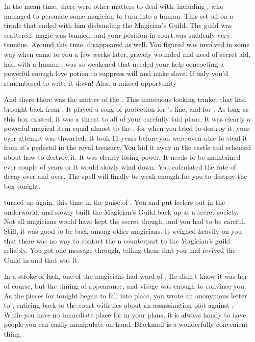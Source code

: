\documentclass[char]{NeptuneBall}
\begin{document}
In the mean time, there were other matters to deal with, including \cAriel{\Prince} \cAriel{}, who managed to persuade some magician to turn \cAriel{\them} into a human. This set \cKing{} off on a tirade that ended with him disbanding the Magician's Guild. The guild was scattered, magic was banned, and your position in court was suddenly very tenuous. Around this time, \cWitch{} disappeared as well. You figured \cWitch{\they} was involved in some way when \cWitch{\they} came to you a few weeks later, gravely wounded and need of secret aid. \cWitch{\They} had with \cWitch{\them} a human \cSlave{\Prince}. \cWitch{} was so weakened that \cWitch{\they} needed your help concocting a powerful enough love potion to suppress \cSlave{\their} will and make \cSlave{\them} \cWitch{\them} slave. If only you'd remembered to write it down! Alas, a missed opportunity

And there there was the matter of the \iMusicBox{\MYname}. This innocuous looking trinket that \cQueen{} had brought back from \cNixie{}. It played a song of protection for \cKing{}'s line, and for \pAtlantis{}. As long as this box existed, it was a threat to all of your carefully laid plans. It was clearly a powerful magical item equal almost to the \iTrident{\MYname}, for when you tried to destroy it, your ever attempt was thwarted. It took 11 years before you were even able to steal it from it's pedestal in the royal treasury. You hid it away in the castle and schemed about how to destroy it. It was clearly losing power. It needs to be maintained ever couple of years or it would slowly wind down. You calculated the rate of decay over and over. The spell will finally be weak enough for you to destroy the box tonight.

\cWitch{} turned up again, this time in the guise of \cWitch{\MYname}. You and \cWitch{\they} put feelers out in the underworld, and slowly built the Magician's Guild back up as a secret society. Not all magicians would have kept the secret though, and you had to be careful. Still, it was good to be back among other magicians. It weighed heavily on you that there was no way to contact the \pPacifica{}n counterpart to the Magician's guild reliably. You got one message through, telling them that you had revived the Guild in \pAtlantis{} and that was it.

In a stroke of luck, one of the magicians had word of \cQueen{}. He didn't know it was her of course, but the timing of \cQueen{\them} appearance, and \cQueen{\them} visage was enough to convince you. As the pieces for tonight began to fall into place, you wrote an anonymous letter to \cQueen{}, enticing \cQueen{\them} back to the court with lies about an assassination plot against \cKing{}. While you have no immediate place for \cQueen{\them} in your plans, it is always handy to have people you can easily manipulate on hand. Blackmail is a wonderfully convenient thing.
\end{document}
